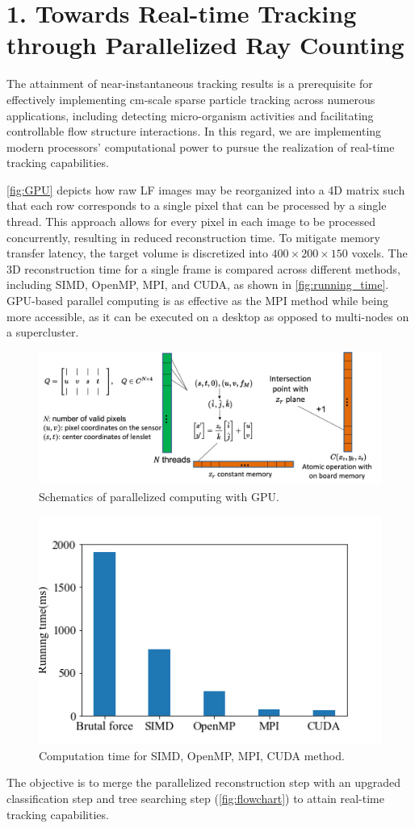 \documentclass[draftthesis,fullpage]{uiucthesis}
\begin{document}
\section*{1. Towards Real-time Tracking through Parallelized Ray Counting}

The attainment of near-instantaneous tracking results is a prerequisite for effectively implementing cm-scale sparse particle tracking across numerous applications, including detecting micro-organism activities and facilitating controllable flow structure interactions. In this regard, we are implementing modern processors' computational power to pursue the realization of real-time tracking capabilities.

\autoref{fig:GPU} depicts how raw LF images may be reorganized into a 4D matrix such that each row corresponds to a single pixel that can be processed by a single thread. This approach allows for every pixel in each image to be processed concurrently, resulting in reduced reconstruction time. To mitigate memory transfer latency, the target volume is discretized into $400 \times 200 \times 150$ voxels. The 3D reconstruction time for a single frame is compared across different methods, including SIMD, OpenMP, MPI, and CUDA, as shown in \autoref{fig:running_time}. GPU-based parallel computing is as effective as the MPI method while being more accessible, as it can be executed on a desktop as opposed to multi-nodes on a supercluster.
\begin{figure}[h]
  \centerline{\includegraphics[width = 0.9\linewidth]{fig/GPU.png}} 
  \caption{Schematics of parallelized computing with GPU.}
\label{fig:GPU}
\end{figure}

\begin{figure}[h]
  \centerline{\includegraphics[width = 0.6\linewidth]{python/running_time.png}} 
  \caption{Computation time for SIMD, OpenMP, MPI, CUDA method.}
\label{fig:running_time}
\end{figure}
The objective is to merge the parallelized reconstruction step with an upgraded classification step and tree searching step (\autoref{fig:flowchart}) to attain real-time tracking capabilities.
\end{document}
